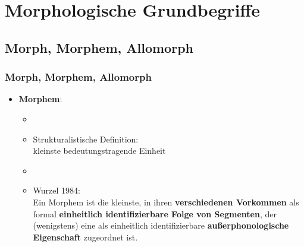 \section{Morphologische Grundbegriffe}

\subsection{Morph, Morphem, Allomorph}


\begin{frame}
\frametitle{Morph, Morphem, Allomorph}

\begin{itemize}
	\item \textbf{Morphem}:

	\begin{itemize}
		\item[]
		\item Strukturalistische Definition: \\
		kleinste bedeutungstragende Einheit
		\item[]
		\item Wurzel 1984: \\
		Ein Morphem ist die kleinste, in ihren \textbf{verschiedenen Vorkommen} als formal \textbf{einheitlich identifizierbare Folge von Segmenten}, der (wenigstens) eine als einheitlich identifizierbare \textbf{außerphonologische Eigenschaft} zugeordnet ist.
	\end{itemize}
\end{itemize}


\end{frame}



